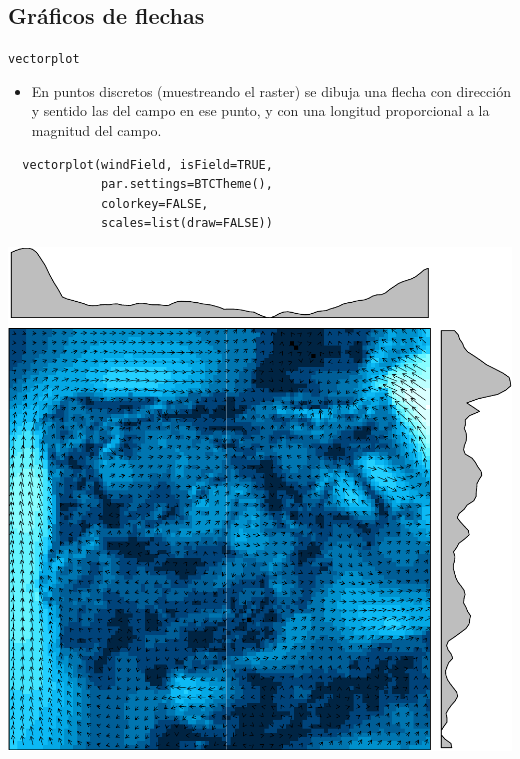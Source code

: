 \documentclass[xcolor={usenames,svgnames,dvipsnames}]{beamer}
\begin{document}
\subsection{Gráficos de flechas}
\label{sec-5-2}
\begin{frame}[fragile,label=sec-5-2-1]{\texttt{vectorplot}}
 \begin{itemize}
\item En puntos discretos (muestreando el raster) se dibuja una flecha con dirección y sentido las del campo en ese punto, y con una longitud proporcional a la magnitud del campo.
\end{itemize}

\lstset{language=R,label= ,caption= ,numbers=none}
\begin{lstlisting}
  vectorplot(windField, isField=TRUE,
             par.settings=BTCTheme(),
             colorkey=FALSE,
             scales=list(draw=FALSE))
\end{lstlisting}
\end{frame}

\begin{frame}[label=sec-5-2-2]{}
\includegraphics[width=.9\linewidth]{figs/vectorplot.pdf}
\end{frame}
\end{document}
